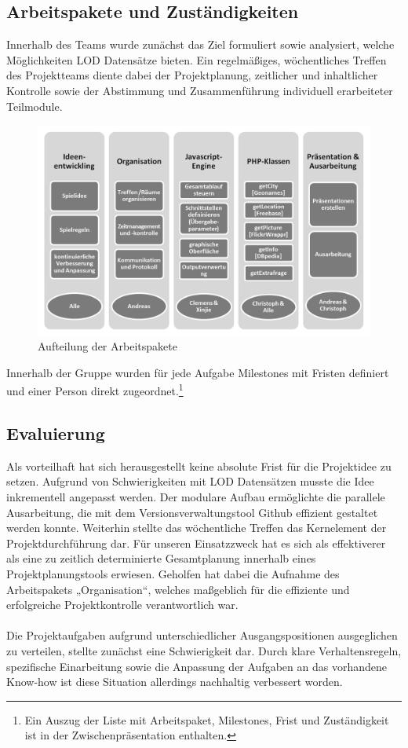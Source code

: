 \documentclass[a4paper, 11pt]{article}
\begin{document}
\subsection{Arbeitspakete und Zuständigkeiten}
Innerhalb des Teams wurde zunächst das Ziel formuliert sowie analysiert, welche Möglichkeiten LOD Datensätze bieten. Ein regelmäßiges, wöchentliches Treffen des Projektteams diente dabei der Projektplanung, zeitlicher und inhaltlicher Kontrolle sowie der Abstimmung und Zusammenführung individuell erarbeiteter Teilmodule.
\begin{figure}[H]
	\centering
	\includegraphics[width=0.8\columnwidth, angle=0]{projektplanung_organigramm_sw.png}
	\caption{Aufteilung der Arbeitspakete}
	\label{pic:Pakete}
\end{figure}
\enlargethispage{2.0cm}
Innerhalb der Gruppe wurden für jede Aufgabe Milestones mit Fristen definiert und einer Person direkt zugeordnet.\footnote{Ein Auszug der Liste mit Arbeitspaket, Milestones, Frist und Zuständigkeit ist in der Zwischenpräsentation enthalten.}
\subsection{Evaluierung}
Als vorteilhaft hat sich herausgestellt keine absolute Frist für die Projektidee zu setzen. Aufgrund von Schwierigkeiten mit LOD Datensätzen musste die Idee inkrementell angepasst werden. Der modulare Aufbau ermöglichte die parallele Ausarbeitung, die mit dem Versionsverwaltungstool Github  effizient gestaltet werden konnte. Weiterhin stellte das wöchentliche Treffen das Kernelement der Projektdurchführung dar. Für unseren Einsatzzweck hat es sich als effektiverer als eine zu zeitlich determinierte Gesamtplanung innerhalb eines Projektplanungstools erwiesen. Geholfen hat dabei die Aufnahme des Arbeitspakets „Organisation“, welches maßgeblich für die effiziente und erfolgreiche Projektkontrolle verantwortlich war.\\\\
Die Projektaufgaben aufgrund unterschiedlicher Ausgangspositionen ausgeglichen zu verteilen, stellte zunächst eine Schwierigkeit dar. Durch klare Verhaltensregeln, spezifische Einarbeitung sowie die Anpassung der Aufgaben an das vorhandene Know-how ist diese Situation allerdings nachhaltig verbessert worden.
\newpage
\end{document}

